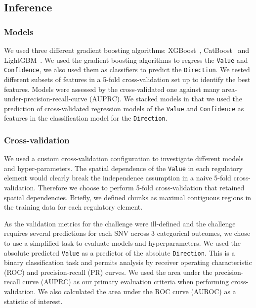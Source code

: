 \documentclass{article}
\begin{document}
\subsection*{Inference}


\subsubsection*{Models}

We used three different gradient boosting algorithms:
XGBoost~\cite{ChenXGBoostScalableTree2016},
CatBoost~\cite{ProkhorenkovaCatBoostunbiasedboosting2017} and
LightGBM~\cite{KeLightGBMHighlyEfficient2017}. We used the gradient boosting
algorithms to regress the \texttt{Value} and \texttt{Confidence}, we also used
them as classifiers to predict the \texttt{Direction}. We tested different
subsets of features in a 5-fold cross-validation set up to identify the best
features.  Models were assessed by the cross-validated one against many
area-under-precision-recall-curve (AUPRC). We stacked models in that we used
the prediction of cross-validated regression models of the \texttt{Value} and
\texttt{Confidence} as features in the classification model for the
\texttt{Direction}.


\subsubsection*{Cross-validation}

We used a custom cross-validation configuration to investigate different models
and hyper-parameters.  The spatial dependence of the \texttt{Value} in each
regulatory element would clearly break the independence assumption in a naive
5-fold cross-validation.  Therefore we choose to perform 5-fold
cross-validation that retained spatial dependencies. Briefly, we defined chunks
as maximal contiguous regions in the training data for each regulatory element.

As the validation metrics for the challenge were ill-defined and the challenge
requires several predictions for each SNV across 3 categorical outcomes, we
chose to use a simplified task to evaluate models and hyperparameters. We used
the absolute predicted \texttt{Value} as a predictor of the absolute
\texttt{Direction}.  This is a binary classification task and permits analysis
by receiver operating characteristic (ROC) and precision-recall (PR) curves. We
used the area under the precision-recall curve (AUPRC) as our primary
evaluation criteria when performing cross-validation. We also calculated the
area under the ROC curve (AUROC) as a statistic of interest.
\end{document}
